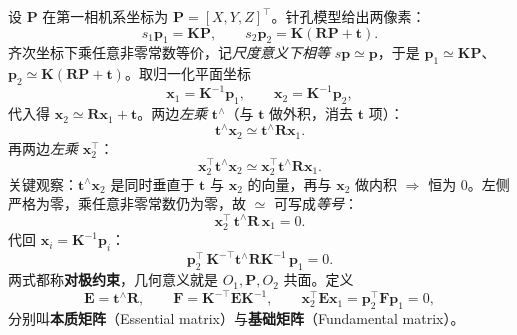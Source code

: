 \begin{derivation}
\label{thm:vo-epi}
设 $\mathbf{P}$ 在第一相机系坐标为 $\mathbf{P}=[X,Y,Z]^\top$。针孔模型给出两像素\cite{gaoxiang2019slam14}：
\begin{equation}
  s_1\mathbf{p}_1=\mathbf{K}\mathbf{P},\qquad s_2\mathbf{p}_2=\mathbf{K}(\mathbf{R}\mathbf{P}+\mathbf{t}).
  \label{eq:vo-pinhole2}
\end{equation}
齐次坐标下乘任意非零常数等价，记\emph{尺度意义下相等} $s\mathbf{p}\simeq\mathbf{p}$，于是 $\mathbf{p}_1\simeq\mathbf{K}\mathbf{P}$、$\mathbf{p}_2\simeq\mathbf{K}(\mathbf{R}\mathbf{P}+\mathbf{t})$。取归一化平面坐标
\begin{equation}
  \mathbf{x}_1=\mathbf{K}^{-1}\mathbf{p}_1,\qquad \mathbf{x}_2=\mathbf{K}^{-1}\mathbf{p}_2,
  \label{eq:vo-norm}
\end{equation}
代入得 $\mathbf{x}_2\simeq\mathbf{R}\mathbf{x}_1+\mathbf{t}$。两边\emph{左乘} $\mathbf{t}^\wedge$（与 $\mathbf{t}$ 做外积，消去 $\mathbf{t}$ 项）：
\begin{equation}
  \mathbf{t}^\wedge\mathbf{x}_2\simeq\mathbf{t}^\wedge\mathbf{R}\mathbf{x}_1.
  \label{eq:vo-cross}
\end{equation}
再两边\emph{左乘} $\mathbf{x}_2^\top$：
\begin{equation}
  \mathbf{x}_2^\top\mathbf{t}^\wedge\mathbf{x}_2\simeq\mathbf{x}_2^\top\mathbf{t}^\wedge\mathbf{R}\mathbf{x}_1.
  \label{eq:vo-cross2}
\end{equation}
关键观察：$\mathbf{t}^\wedge\mathbf{x}_2$ 是同时垂直于 $\mathbf{t}$ 与 $\mathbf{x}_2$ 的向量，再与 $\mathbf{x}_2$ 做内积 $\Rightarrow$ 恒为 $0$。左侧严格为零，乘任意非零常数仍为零，故 $\simeq$ 可写成\emph{等号}：
\begin{equation}
  \boxed{\ \mathbf{x}_2^\top\,\mathbf{t}^\wedge\mathbf{R}\,\mathbf{x}_1=0.\ }
  \label{eq:vo-epi-x}
\end{equation}
代回 $\mathbf{x}_i=\mathbf{K}^{-1}\mathbf{p}_i$：
\begin{equation}
  \mathbf{p}_2^\top\,\mathbf{K}^{-\top}\mathbf{t}^\wedge\mathbf{R}\mathbf{K}^{-1}\,\mathbf{p}_1=0.
  \label{eq:vo-epi-p}
\end{equation}
两式都称\textbf{对极约束}，几何意义就是 $O_1,\mathbf{P},O_2$ 共面。定义
\begin{equation}
  \mathbf{E}=\mathbf{t}^\wedge\mathbf{R},\qquad \mathbf{F}=\mathbf{K}^{-\top}\mathbf{E}\mathbf{K}^{-1},\qquad
  \mathbf{x}_2^\top\mathbf{E}\mathbf{x}_1=\mathbf{p}_2^\top\mathbf{F}\mathbf{p}_1=0,
  \label{eq:vo-EF}
\end{equation}
分别叫\textbf{本质矩阵}（Essential matrix）与\textbf{基础矩阵}（Fundamental matrix）。
\end{derivation}

